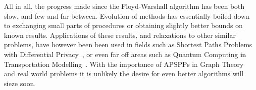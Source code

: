 All in all, the progress made since the Floyd-Warshall algorithm has been both slow, and few and far between.
Evolution of methods has essentially boiled down to exchanging small parts of procedures or obtaining slightly better bounds on known results.
Applications of these results, and relaxations to other similar problems, have however been been used in fields such as Shortest Paths Problems with Differential Privacy~\cite{Chen2022}, or even far off areas such as Quantum Computing in Transportation Modelling~\cite{Cooper2022}.
With the importance of APSPPs in Graph Theory and real world problems it is unlikely the desire for even better algorithms will sieze soon.
